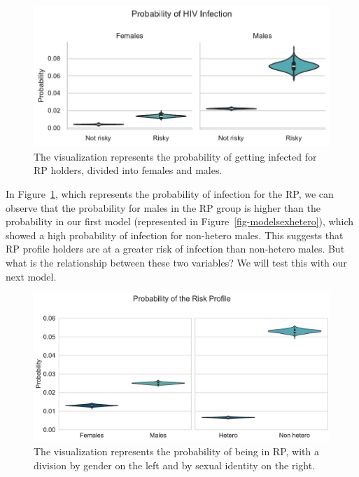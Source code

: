 \documentclass[
  12pt,
  letterpaper,
  DIV=11,
  numbers=noendperiod]{scrartcl}
\begin{document}
\begin{figure}

{\centering \includegraphics{HIVPaper_files/figure-latex/fig-riskprofgenderhiv-output-1.pdf}

}

\caption{\label{fig-riskprofgenderhiv}The visualization represents the
probability of getting infected for RP holders, divided into females and
males.}

\end{figure}

In Figure~\ref{fig-riskprofgenderhiv}, which represents the probability
of infection for the RP, we can observe that the probability for males
in the RP group is higher than the probability in our first model
(represented in Figure~\ref{fig-modelsexhetero}), which showed a high
probability of infection for non-hetero males. This suggests that RP
profile holders are at a greater risk of infection than non-hetero
males. But what is the relationship between these two variables? We will
test this with our next model.

\begin{figure}

{\centering \includegraphics{HIVPaper_files/figure-latex/fig-twinriskprob-output-1.pdf}

}

\caption{\label{fig-twinriskprob}The visualization represents the
probability of being in RP, with a division by gender on the left and by
sexual identity on the right.}

\end{figure}
\end{document}

